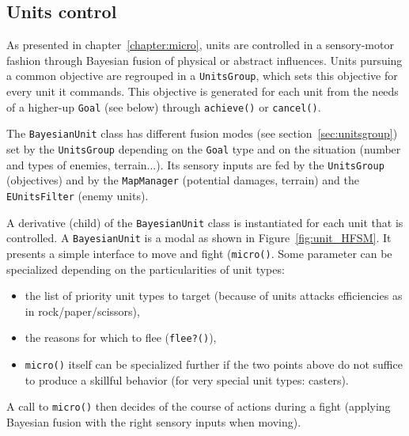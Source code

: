 \subsection{Units control}
\label{sec:micromanagementcode}

As presented in chapter~\ref{chapter:micro}, units are controlled in a sensory-motor fashion through Bayesian fusion of physical or abstract influences. Units pursuing a common objective are regrouped in a \texttt{UnitsGroup}, which sets this objective for every unit it commands. This objective is generated for each unit from the needs of a higher-up \texttt{Goal} (see below) through \texttt{achieve()} or \texttt{cancel()}.

The \texttt{BayesianUnit} class has different fusion modes (see section~\ref{sec:unitsgroup}) set by the \texttt{UnitsGroup} depending on the \texttt{Goal} type and on the situation (number and types of enemies, terrain...). Its sensory inputs are fed by the \texttt{UnitsGroup} (objectives) and by the \texttt{MapManager} (potential damages, terrain) and the \texttt{EUnitsFilter} (enemy units).

A derivative (child) of the \texttt{BayesianUnit} class is instantiated for each unit that is controlled. A \texttt{BayesianUnit} is a modal  as shown in Figure~\ref{fig:unit_HFSM}. It presents a simple interface to move and fight (\texttt{micro()}. Some parameter can be specialized depending on the particularities of unit types:
\begin{itemize}
    \item the list of priority unit types to target (because of units attacks efficiencies as in rock/paper/scissors),
    \item the reasons for which to flee (\texttt{flee?()}),
    \item \texttt{micro()} itself can be specialized further if the two points above do not suffice to produce a skillful behavior (for very special unit types: casters).
\end{itemize}
A call to \texttt{micro()} then decides of the course of actions during a fight (applying Bayesian fusion with the right sensory inputs when moving).


